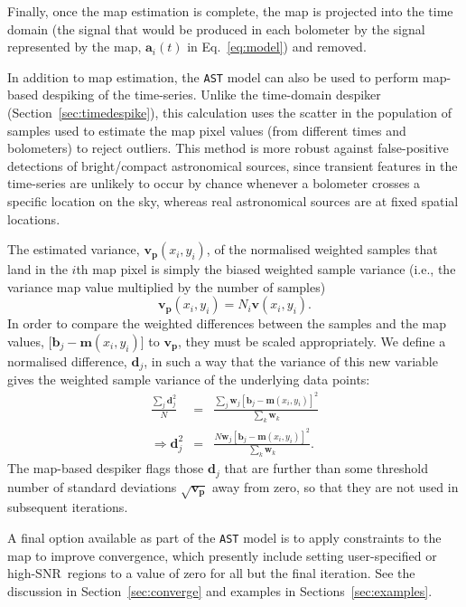 \documentclass[useAMS,usenatbib,nofootinbib]{mn2e}
\newcommand{\snr}{SNR}
\newcommand{\model}[1]{\texttt{#1}}
\begin{document}
Finally, once the map estimation is complete, the map is projected
into the time domain (the signal that would be produced in each
bolometer by the signal represented by the map, $\mathbf{a}_i(t)$ in
Eq.~\ref{eq:model}) and removed.

In addition to map estimation, the \model{AST} model can also be used
to perform map-based despiking of the time-series. Unlike the
time-domain despiker (Section~\ref{sec:timedespike}), this calculation
uses the scatter in the population of samples used to estimate the map
pixel values (from different times and bolometers) to reject
outliers. This method is more robust against false-positive detections
of bright/compact astronomical sources, since transient features in
the time-series are unlikely to occur by chance whenever a bolometer
crosses a specific location on the sky, whereas real astronomical
sources are at fixed spatial locations.

The estimated variance, $\mathbf{v_p}(x_i,y_i)$, of the normalised
weighted samples that land in the $i$th map pixel is simply the biased
weighted sample variance (i.e., the variance map value multiplied by
the number of samples)
%
\begin{equation}
  \mathbf{v_p}(x_i,y_i) = N_i \mathbf{v}(x_i,y_i).
\end{equation}
%
In order to compare the weighted differences between the samples and
the map values, [$\mathbf{b}_j - \mathbf{m}(x_i,y_i)$] to
$\mathbf{v_p}$, they must be scaled appropriately. We define a
normalised difference, $\mathbf{d}_j$, in such a way that the variance
of this new variable gives the weighted sample variance of the
underlying data points:
%
\begin{eqnarray}
  \frac{\sum_j \mathbf{d}_j^2}{N} &=&
  \frac{\sum_j \mathbf{w}_j [\mathbf{b}_j - \mathbf{m}(x_i,y_i)]^2}
       {\sum_k \mathbf{w}_k} \\
   \Rightarrow \mathbf{d}_j^2 &=& \frac{N \mathbf{w}_j [\mathbf{b}_j -
       \mathbf{m}(x_i,y_i)]^2}{ \sum_k \mathbf{w}_k} .
\end{eqnarray}
%
The map-based despiker flags those $\mathbf{d}_j$ that are further
than some threshold number of standard deviations
$\sqrt{\mathbf{v_p}}$ away from zero, so that they are not used in
subsequent iterations.

A final option available as part of the \model{AST} model is to apply
constraints to the map to improve convergence, which presently include
setting user-specified or high-\snr\ regions to a value of zero for
all but the final iteration. See the discussion in
Section~\ref{sec:converge} and examples in
Sections~\ref{sec:examples}.
\end{document}
